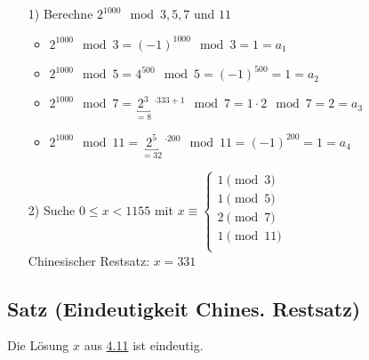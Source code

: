 \documentclass[a4paper, 12pt,titlepage, pdf, headsepline]{article}
\renewcommand{\>}{\rightarrow}
\renewcommand{\*}{\cdot}
\begin{document}
\begin{itemize}
\begin{itemize}
		      		\item[1)] Berechne $2^{1000} \mod 3,5,7$ und $11$
		      		      \begin{itemize}
		      		      	\item $2^{1000} \mod 3 = (-1)^{1000} \mod 3 = 1=a_1$
		      		      	\item $2^{1000} \mod 5 = 4^{500} \mod 5 = (-1)^{500} = 1=a_2$
		      		      	\item $2^{1000} \mod 7 = \underbracket{2^3}_{=8}~^{\*333+1} \mod 7 = 1 \cdot 2\mod 7 = 2=a_3$
		      		      	\item $2^{1000} \mod 11 = \underbracket{2^5}_{=32}~^{\*200} \mod 11 = (-1)^{200} = 1=a_4$
		      		      \end{itemize}
		      		\item[2)] Suche $0 \leq x < 1155$ mit $x \equiv \begin{cases*}
		      		      1 \pmod{3}\\
		      		      1 \pmod {5}\\
		      		      2 \pmod {7}\\
		      		      1 \pmod{ 11}\\
		      		\end{cases*}$\\
		      		Chinesischer Restsatz: $x = 331$
		      	\end{itemize}
		      	\end{itemize}
		      	\subsection{Satz (Eindeutigkeit Chines. Restsatz)}
		      	\label{4.13}
		      	Die Lösung $x$ aus \hyperref[4.11]{4.11} ist eindeutig.
\end{document}
